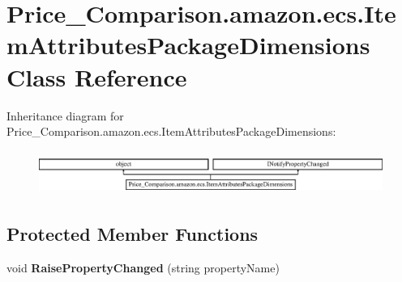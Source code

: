 \hypertarget{class_price___comparison_1_1amazon_1_1ecs_1_1_item_attributes_package_dimensions}{\section{Price\-\_\-\-Comparison.\-amazon.\-ecs.\-Item\-Attributes\-Package\-Dimensions Class Reference}
\label{class_price___comparison_1_1amazon_1_1ecs_1_1_item_attributes_package_dimensions}
}


 


Inheritance diagram for Price\-\_\-\-Comparison.\-amazon.\-ecs.\-Item\-Attributes\-Package\-Dimensions\-:\begin{figure}[H]
\begin{center}
\leavevmode
\includegraphics[height=1.447028cm]{class_price___comparison_1_1amazon_1_1ecs_1_1_item_attributes_package_dimensions}
\end{center}
\end{figure}
\subsection*{Protected Member Functions}
\begin{DoxyCompactItemize}
\item 
\hypertarget{class_price___comparison_1_1amazon_1_1ecs_1_1_item_attributes_package_dimensions_a6dd2c1b3d2a57c977985ded62902fefa}{void {\bfseries Raise\-Property\-Changed} (string property\-Name)}\label{class_price___comparison_1_1amazon_1_1ecs_1_1_item_attributes_package_dimensions_a6dd2c1b3d2a57c977985ded62902fefa}

\end{DoxyCompactItemize}
